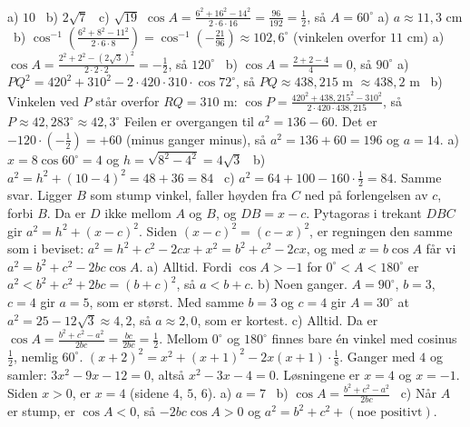 
 a) $10$ \ b) $2\sqrt7$ \ c) $\sqrt{19}$
 $\cos A = \frac{6^2 + 16^2 - 14^2}{2\cdot6\cdot16} = \frac{96}{192} = \frac12$, så $A = 60^\circ$
 a) $a \approx 11{,}3$ cm \ b) $\cos^{-1}\!\left(\frac{6^2 + 8^2 - 11^2}{2\cdot 6\cdot 8}\right) = \cos^{-1}\!\left(-\frac{21}{96}\right) \approx 102{,}6^\circ$ (vinkelen overfor $11$ cm)
 a) $\cos A = \frac{2^2 + 2^2 - (2\sqrt3)^2}{2\cdot2\cdot2} = -\frac12$, så $120^\circ$ \ b) $\cos A = \frac{2+2-4}{4} = 0$, så $90^\circ$
 a) $PQ^2 = 420^2 + 310^2 - 2\cdot420\cdot310\cdot\cos 72^\circ$, så $PQ \approx 438{,}215$ m $\approx 438{,}2$ m \ b) Vinkelen ved $P$ står overfor $RQ = 310$ m: $\cos P = \frac{420^2 + 438{,}215^2 - 310^2}{2\cdot 420\cdot 438{,}215}$, så $P \approx 42{,}283^\circ \approx 42{,}3^\circ$
 Feilen er overgangen til $a^2 = 136 - 60$. Det er $-120\cdot(-\frac12) = +60$ (minus ganger minus), så $a^2 = 136 + 60 = 196$ og $a = 14$.
 a) $x = 8\cos 60^\circ = 4$ og $h = \sqrt{8^2 - 4^2} = 4\sqrt3$ \ b) $a^2 = h^2 + (10-4)^2 = 48 + 36 = 84$ \ c) $a^2 = 64 + 100 - 160\cdot\frac12 = 84$. Samme svar.
 Ligger $B$ som stump vinkel, faller høyden fra $C$ ned på forlengelsen av $c$, forbi $B$. Da er $D$ ikke mellom $A$ og $B$, og $DB = x - c$.
Pytagoras i trekant $DBC$ gir $a^2 = h^2 + (x-c)^2$. Siden $(x-c)^2 = (c-x)^2$, er regningen den samme som i beviset: $a^2 = h^2 + c^2 - 2cx + x^2 = b^2 + c^2 - 2cx$, og med $x = b\cos A$ får vi $a^2 = b^2 + c^2 - 2bc\cos A$.
 a) Alltid. Fordi $\cos A > -1$ for $0^\circ < A < 180^\circ$ er $a^2 < b^2 + c^2 + 2bc = (b+c)^2$, så $a < b + c$.
b) Noen ganger. $A = 90^\circ$, $b = 3$, $c = 4$ gir $a = 5$, som er størst. Med samme $b = 3$ og $c = 4$ gir $A = 30^\circ$ at $a^2 = 25 - 12\sqrt3 \approx 4{,}2$, så $a \approx 2{,}0$, som er kortest.
c) Alltid. Da er $\cos A = \frac{b^2 + c^2 - a^2}{2bc} = \frac{bc}{2bc} = \frac12$. Mellom $0^\circ$ og $180^\circ$ finnes bare én vinkel med cosinus $\frac12$, nemlig $60^\circ$.
 $(x+2)^2 = x^2 + (x+1)^2 - 2x(x+1)\cdot\frac18$. Ganger med $4$ og samler: $3x^2 - 9x - 12 = 0$, altså $x^2 - 3x - 4 = 0$. Løsningene er $x = 4$ og $x = -1$. Siden $x > 0$, er $x = 4$ (sidene $4$, $5$, $6$).
 a) $a = 7$ \ b) $\cos A = \frac{b^2 + c^2 - a^2}{2bc}$ \ c) Når $A$ er stump, er $\cos A < 0$, så $-2bc\cos A > 0$ og $a^2 = b^2 + c^2 + (\text{noe positivt})$.

